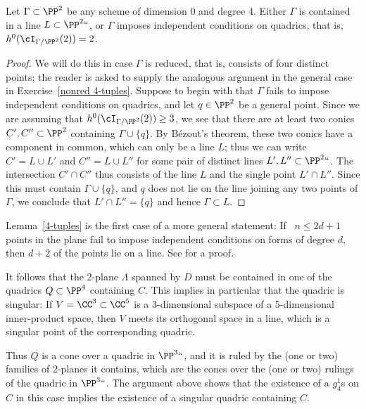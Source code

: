 \begin{lemma}\label{4-tuples}
Let $\Gamma \subset \PP^2$ be any scheme of dimension $0$ and degree
$4$. Either $\Gamma$ is contained in a line $L \subset \PP^2` `$, or
$\Gamma$ imposes
independent conditions on quadrics,
%
that is,
$h^0(\cI_{\Gamma /\PP^2}(2)) = 2$.
\end{lemma}

\begin{proof}
We will do this in case $\Gamma$ is reduced, that is, consists of four distinct points; the reader is asked to supply the analogous argument in the general case in Exercise~\ref{nonred 4-tuples}. Suppose to begin with that $\Gamma$ fails to impose independent conditions on quadrics, and let $q \in \PP^2$ be a general point. Since we are assuming that $h^0(\cI_{\Gamma /\PP^2}(2)) \geq 3$, we see that there are at least two conics $C', C'' \subset \PP^2$ containing $\Gamma \cup \{q\}$. By B\'ezout's theorem, these two conics have a component in common, which can only be a line $L$; thus we can write $C' = L \cup L'$ and $C'' = L \cup L''$ for some pair of distinct lines $L', L'' \subset \PP^2` `$. The intersection $C' \cap C''$ thus consists of the line $L$ and the single point $L' \cap L''$. Since this must contain $\Gamma \cup \{q\}$, and $q$ does not lie on the line joining any two points of $\Gamma$, we conclude that $L' \cap L'' = \{q\}$ and hence $\Gamma \subset L$.
\end{proof}

\begin{fact}
Lemma~\ref{4-tuples} is the first case of a more general statement: If~
$n\leq 2d+1$ points in the plane fail to impose independent conditions
%
on forms of degree $d$, then $d+2$ of the points lie on a line. See
\cite[p.~302]{MR1376653} for a proof.
\end{fact}


 It follows that the 2-plane $\Lambda$ spanned by $D$ must be contained in one of the quadrics $Q \subset \PP^4$ containing $C$. This implies in particular that the quadric is singular: If $V = \CC^3\subset \CC^5$
is a  3-dimensional subspace of a 5-dimensional inner-product space, then $V$ meets its orthogonal space
in a line, which is a singular point of the corresponding quadric.

Thus $Q$ is a
cone over a quadric
%
in $\PP^3` `$, and it is ruled by
the (one or two) families of 2-planes it contains, which are the cones
over the (one or two) rulings of the quadric in $\PP^3` `$. The
argument above shows that the existence of a $g_4^1$s on $C$ in this
case implies the existence of a singular quadric containing $C$.

